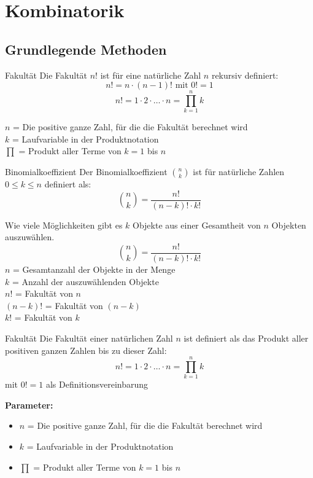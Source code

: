 
\section{Kombinatorik}

\subsection{Grundlegende Methoden}

\begin{definition}{Fakultät}
Die Fakultät $n!$ ist für eine natürliche Zahl $n$ rekursiv definiert:
\[ n! = n \cdot (n-1)! \text{ mit } 0! = 1 \]
$$
n!=1 \cdot 2 \cdot \ldots \cdot n=\prod_{k=1}^{n} k
$$

   $n$ = Die positive ganze Zahl, für die die Fakultät berechnet wird\\
   $k$ = Laufvariable in der Produktnotation\\
   $\prod$ = Produkt aller Terme von $k=1$ bis $n$\\
\end{definition}

\begin{definition}{Binomialkoeffizient}
Der Binomialkoeffizient $\binom{n}{k}$ ist für natürliche Zahlen $0 \leq k \leq n$ definiert als:
\[ \binom{n}{k} = \frac{n!}{(n-k)! \cdot k!} \]

Wie viele Möglichkeiten gibt es $k$ Objekte aus einer Gesamtheit von $n$ Objekten auszuwählen.
$$
\binom{n}{k}=\frac{n!}{(n-k)!\cdot k!}
$$
   $n$ = Gesamtanzahl der Objekte in der Menge\\
   $k$ = Anzahl der auszuwählenden Objekte\\
   $n!$ = Fakultät von $n$\\
   $(n-k)!$ = Fakultät von $(n-k)$\\
   $k!$ = Fakultät von $k$\\
\end{definition}

\begin{definition}{Fakultät}
Die Fakultät einer natürlichen Zahl $n$ ist definiert als das Produkt aller positiven ganzen Zahlen bis zu dieser Zahl:
$$
n!=1 \cdot 2 \cdot \ldots \cdot n=\prod_{k=1}^{n} k
$$
mit $0! = 1$ als Definitionsvereinbarung

\textbf{Parameter:}
\begin{itemize}
    \item $n$ = Die positive ganze Zahl, für die die Fakultät berechnet wird
    \item $k$ = Laufvariable in der Produktnotation
    \item $\prod$ = Produkt aller Terme von $k=1$ bis $n$
\end{itemize}
\end{definition}


